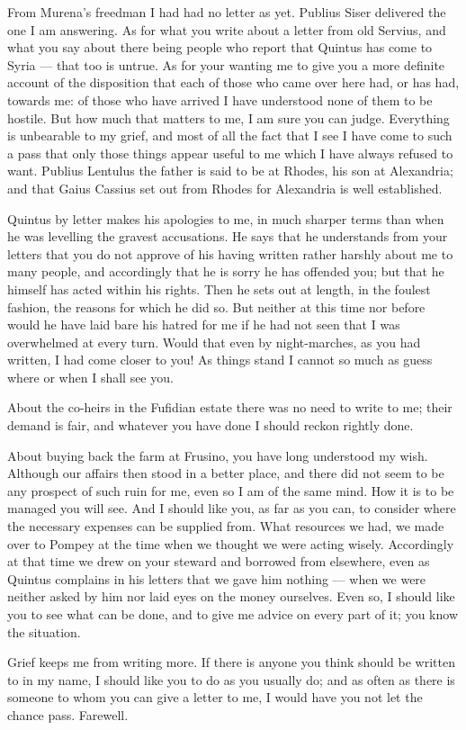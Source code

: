 

 From Murena's freedman I had had no letter as yet. Publius Siser delivered the one I am answering. As for what you write about a letter from old Servius, and what you say about there being people who report that Quintus has come to Syria --- that too is untrue. As for your wanting me to give you a more definite account of the disposition that each of those who came over here had, or has had, towards me: of those who have arrived I have understood none of them to be hostile. But how much that matters to me, I am sure you can judge. Everything is unbearable to my grief, and most of all the fact that I see I have come to such a pass that only those things appear useful to me which I have always refused to want. Publius Lentulus the father is said to be at Rhodes, his son at Alexandria; and that Gaius Cassius set out from Rhodes for Alexandria is well established.

 Quintus by letter makes his apologies to me, in much sharper terms than when he was levelling the gravest accusations. He says that he understands from your letters that you do not approve of his having written rather harshly about me to many people, and accordingly that he is sorry he has offended you; but that he himself has acted within his rights. Then he sets out at length, in the foulest fashion, the reasons for which he did so. But neither at this time nor before would he have laid bare his hatred for me if he had not seen that I was overwhelmed at every turn. Would that even by night-marches, as you had written, I had come closer to you! As things stand I cannot so much as guess where or when I shall see you.

 About the co-heirs in the Fufidian estate there was no need to write to me; their demand is fair, and whatever you have done I should reckon rightly done.

 About buying back the farm at Frusino, you have long understood my wish. Although our affairs then stood in a better place, and there did not seem to be any prospect of such ruin for me, even so I am of the same mind. How it is to be managed you will see. And I should like you, as far as you can, to consider where the necessary expenses can be supplied from. What resources we had, we made over to Pompey at the time when we thought we were acting wisely. Accordingly at that time we drew on your steward and borrowed from elsewhere, even as Quintus complains in his letters that we gave him nothing --- when we were neither asked by him nor laid eyes on the money ourselves. Even so, I should like you to see what can be done, and to give me advice on every part of it; you know the situation.

 Grief keeps me from writing more. If there is anyone you think should be written to in my name, I should like you to do as you usually do; and as often as there is someone to whom you can give a letter to me, I would have you not let the chance pass. Farewell.
